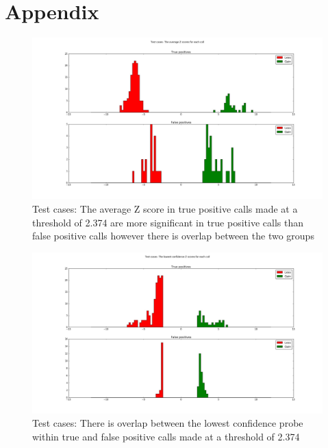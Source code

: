 \chapter{Appendix}
\begin{figure}
\centering
\includegraphics[width=1\linewidth]{./Figures/testcasesaverageconfidenceZscore}
\caption[Test cases: The average Z score at a threshold of 2.374]{Test cases: The average Z score in true positive calls made at a threshold of 2.374 are more significant in true positive calls than false positive calls however there is overlap between the two groups}
\label{fig:testcasesaverageconfidenceZscore}
\end{figure}

\begin{figure}
\centering
\includegraphics[width=1\linewidth]{./Figures/testcaseslowestconfidenceZscore}
\caption[Test cases: The lowest confidence probe within calls at a threshold of 2.374]{Test cases: There is overlap between the lowest confidence probe within true and false positive calls made at a threshold of 2.374}
\label{fig:testcaseslowestconfidenceZscore}
\end{figure}

